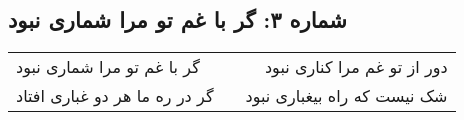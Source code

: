 \begin{center}
\section*{شماره ۳: گر با غم تو مرا شماری نبود}
\label{sec:003}
\begin{longtable}{l p{0.5cm} r}
گر با غم تو مرا شماری نبود
&&
دور از تو غم مرا کناری نبود
\\
گر در ره ما هر دو غباری افتاد
&&
شک نیست که راه بیغباری نبود
\\
\end{longtable}
\end{center}

